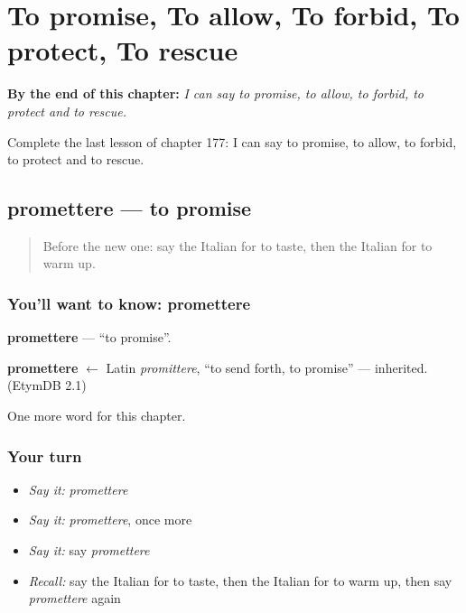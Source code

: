 
\chapter{To promise, To allow, To forbid, To protect, To rescue}
\label{ch:it-to-promise-to-allow-to-forbid-to-protect-to-rescue}

\begin{chapteropening}
\textbf{By the end of this chapter:} \emph{I can say to promise, to allow, to forbid, to protect and to rescue.}

Complete the last lesson of chapter 177: I can say to promise, to allow, to forbid, to protect and to rescue.
\end{chapteropening}

\section[promettere]{promettere — to promise}

\label{lesson:IT-C177-promettere}



\begin{quote}
Before the new one: say the Italian for to taste, then the Italian for to warm up.
\end{quote}

\subsection*{You'll want to know: promettere}
\textbf{promettere} — \textquotedblleft{}to promise\textquotedblright{}.

\begin{cousinweb}
\textbf{promettere} $\leftarrow$ Latin \emph{promittere}, \textquotedblleft{}to send forth, to promise\textquotedblright{} — inherited. (EtymDB 2.1)
\end{cousinweb}

\begin{grammarlens}[title={What you've built}]
One more word for this chapter.
\end{grammarlens}

\subsection*{Your turn}
\begin{itemize}
\raggedright
  \item \emph{Say it:} \emph{promettere}
  \item \emph{Say it:} \emph{promettere}, once more
  \item \emph{Say it:} say \emph{promettere}
  \item \emph{Recall:} say the Italian for to taste, then the Italian for to warm up, then say \emph{promettere} again
\end{itemize}

